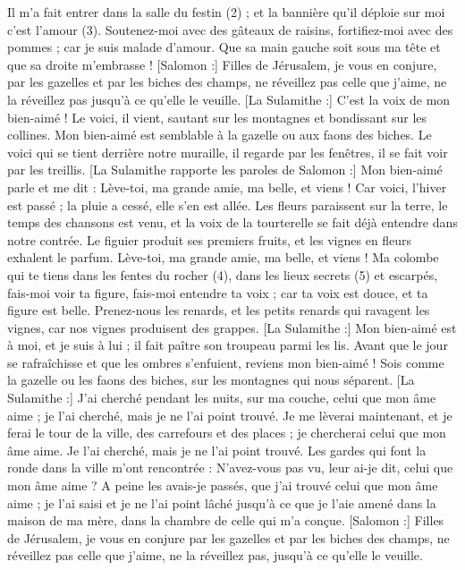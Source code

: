 \begin{multicols}{2}
Il m'a fait entrer dans la salle du festin (2) ; et la bannière qu’il déploie sur moi c’est l’amour (3).
Soutenez-moi avec des gâteaux de raisins, fortifiez-moi avec des pommes ; car je suis malade d'amour.
Que sa main gauche soit sous ma tête et que sa droite m'embrasse !
[Salomon :] Filles de Jérusalem, je vous en conjure, par les gazelles et par les biches des champs, ne réveillez pas celle que j'aime, ne la réveillez pas jusqu'à ce qu'elle le veuille.
[La Sulamithe :] C'est la voix de mon bien-aimé ! Le voici, il vient, sautant sur les montagnes et bondissant sur les collines.
Mon bien-aimé est semblable à la gazelle ou aux faons des biches. Le voici qui se tient derrière notre muraille, il regarde par les fenêtres, il se fait voir par les treillis.
[La Sulamithe rapporte les paroles de Salomon :] Mon bien-aimé parle et me dit : Lève-toi, ma grande amie, ma belle, et viens !
Car voici, l'hiver est passé ; la pluie a cessé, elle s'en est allée.
Les fleurs paraissent sur la terre, le temps des chansons est venu, et la voix de la tourterelle se fait déjà entendre dans notre contrée.
Le figuier produit ses premiers fruits, et les vignes en fleurs exhalent le parfum. Lève-toi, ma grande amie, ma belle, et viens !
Ma colombe qui te tiens dans les fentes du rocher (4), dans les lieux secrets (5) et escarpés, fais-moi voir ta figure, fais-moi entendre ta voix ; car ta voix est douce, et ta figure est belle.
Prenez-nous les renards, et les petits renards qui ravagent les vignes, car nos vignes produisent des grappes.
[La Sulamithe :] Mon bien-aimé est à moi, et je suis à lui ; il fait paître son troupeau parmi les lis.
Avant que le jour se rafraîchisse et que les ombres s'enfuient, reviens mon bien-aimé ! Sois comme la gazelle ou les faons des biches, sur les montagnes qui nous séparent.
\VerseOne{}[La Sulamithe :] J'ai cherché pendant les nuits, sur ma couche, celui que mon âme aime ; je l'ai cherché, mais je ne l'ai point trouvé.
Je me lèverai maintenant, et je ferai le tour de la ville, des carrefours et des places ; je chercherai celui que mon âme aime. Je l'ai cherché, mais je ne l'ai point trouvé.
Les gardes qui font la ronde dans la ville m'ont rencontrée : N'avez-vous pas vu, leur ai-je dit, celui que mon âme aime ?
A peine les avais-je passés, que j’ai trouvé celui que mon âme aime ; je l’ai saisi et je ne l’ai point lâché jusqu’à ce que je l'aie amené dans la maison de ma mère, dans la chambre de celle qui m'a conçue.
[Salomon :] Filles de Jérusalem, je vous en conjure par les gazelles et par les biches des champs, ne réveillez pas celle que j'aime, ne la réveillez pas, jusqu'à ce qu'elle le veuille.

\end{multicols}
